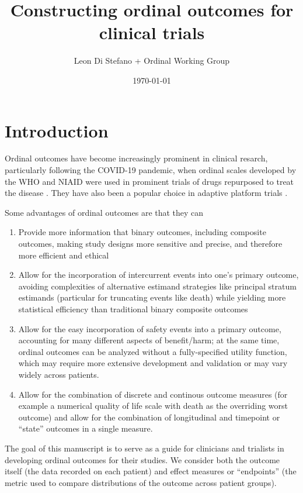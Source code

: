 \documentclass[
  11pt,
  fleqn
]{article}
\title{Constructing ordinal outcomes for clinical trials}
\author{Leon Di Stefano + Ordinal
Working Group}
\date{\today}
\begin{document}
\maketitle

\tableofcontents
\newpage

\section{Introduction}

Ordinal outcomes have become increasingly prominent in clinical
resarch, particularly following the COVID-19 pandemic, when ordinal
scales developed by the WHO and NIAID were used in prominent trials
of drugs repurposed to treat the disease . They have also
been a popular choice in adaptive platform trials .

Some advantages of ordinal outcomes are that they can
\begin{enumerate}
  \item Provide more information that binary outcomes, including
    composite outcomes, making study designs more sensitive and precise, and
    therefore more efficient and ethical

  \item Allow for the incorporation of intercurrent events into one's primary
    outcome, avoiding complexities of alternative estimand strategies like
    principal stratum estimands (particular for truncating events
    like death) while
    yielding more statistical efficiency than traditional binary
    composite outcomes

  \item Allow for the easy incorporation of safety events into a
    primary outcome, accounting for many different aspects
    of benefit/harm; at the same time, ordinal outcomes can be
    analyzed without a
    fully-specified utility function, which may require more
    extensive development and validation or may vary widely across patients.

  \item Allow for the combination of discrete and continous outcome
    measures (for
      example a numerical quality of life scale with death as the
      overriding worst
    outcome) and allow for the combination of longitudinal and timepoint or
    ``state'' outcomes in a single measure.

\end{enumerate}

The goal of this manuscript is to serve as a guide for clinicians and trialists
in developing ordinal outcomes for their studies. We consider both the outcome
itself (the data recorded on each patient) and effect measures or ``endpoints''
(the metric used to compare distributions of the outcome across patient
groups).
\end{document}
